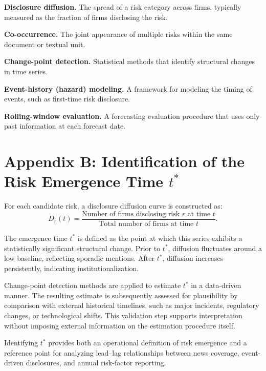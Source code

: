 \documentclass[11pt,a4paper]{article}
\begin{document}
\textbf{Disclosure diffusion.} The spread of a risk category across firms, typically measured as the fraction of firms disclosing the risk.

\textbf{Co-occurrence.} The joint appearance of multiple risks within the same document or textual unit.

\textbf{Change-point detection.} Statistical methods that identify structural changes in time series.

\textbf{Event-history (hazard) modeling.} A framework for modeling the timing of events, such as first-time risk disclosure.

\textbf{Rolling-window evaluation.} A forecasting evaluation procedure that uses only past information at each forecast date.

\section{Appendix B: Identification of the Risk Emergence Time \( t^* \)}

For each candidate risk, a disclosure diffusion curve is constructed as:
\[
D_r(t) = \frac{\text{Number of firms disclosing risk } r \text{ at time } t}{\text{Total number of firms at time } t}.
\]

The emergence time \( t^* \) is defined as the point at which this series exhibits a statistically significant structural change. Prior to \( t^* \), diffusion fluctuates around a low baseline, reflecting sporadic mentions. After \( t^* \), diffusion increases persistently, indicating institutionalization.

Change-point detection methods are applied to estimate \( t^* \) in a data-driven manner. The resulting estimate is subsequently assessed for plausibility by comparison with external historical timelines, such as major incidents, regulatory changes, or technological shifts. This validation step supports interpretation without imposing external information on the estimation procedure itself.

Identifying \( t^* \) provides both an operational definition of risk emergence and a reference point for analyzing lead--lag relationships between news coverage, event-driven disclosures, and annual risk-factor reporting.
\end{document}
